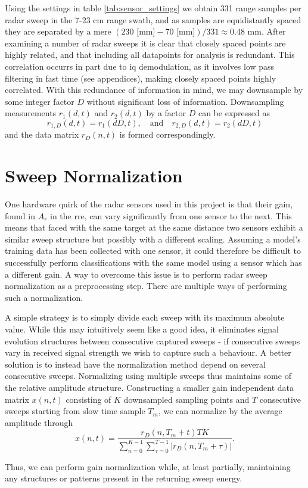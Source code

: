 Using the settings in table \ref{tab:sensor_settings} we obtain 331 range samples per radar sweep in the 7-23 cm range swath, and as samples are equidistantly spaced they are separated by a mere $(230 \text{ [mm]}-70\text{ [mm]})/331\approx0.48$ mm. After examining a number of radar sweeps it is clear that closely spaced points are highly related, and that including all datapoints for analysis is redundant. This correlation occurrs in part due to \gls{iq} demodulation, as it involves low pass filtering in fast time (see appendices), making closely spaced points highly correlated. With this redundance of information in mind, we may downsample by some integer factor $D$ without significant loss of information. Downsampling measurements $r_1(d,t)$ and $r_2(d,t)$ by a factor $D$ can be expressed as
\begin{equation}
\label{eq:downsamp}
	r_{1,D}(d, t) = r_{1}(dD,t),
	\quad \text{and} \quad r_{2,D}(d,t) = r_{2}(dD,t)
\end{equation}
and the data matrix $r_D(n,t)$ is formed correspondingly.

\section{Sweep Normalization}\label{sec:norm}

One hardware quirk of the radar sensors used in this project is that their gain, found in $A_r$ in the \gls{rre}, can vary significantly from one sensor to the next. This means that faced with the same target at the same distance two sensors exhibit a similar sweep structure but possibly with a different scaling. Assuming a model's training data has been collected with one sensor, it could therefore be difficult to successfully perform classifications with the same model using a sensor which has a different gain. A way to overcome this issue is to perform radar sweep normalization as a preprocessing step. There are multiple ways of performing such a normalization. %

A simple strategy is to simply divide each sweep with its maximum absolute value. While this may intuitively seem like a good idea, it eliminates signal evolution structures between consecutive captured sweeps - if consecutive sweeps vary in received signal strength we wish to capture such a behaviour. A better solution is to instead have the normalization method depend on several consecutive sweeps. Normalizing using multiple sweeps thus maintains some of the relative amplitude structure. Constructing a smaller gain independent data matrix $x(n,t)$ consisting of $K$ downsampled sampling points and $T$ consecutive sweeps starting from slow time sample $T_m$, we can normalize by the average amplitude through
\begin{equation}
	x(n,t) = 
	\frac{r_D(n, T_m + t)TK}{\sum_{n=0}^{K-1}\sum_{\tau=0}^{T-1}|r_D(n, T_m+\tau)|}.
\end{equation}

Thus, we can perform gain normalization while, at least partially, maintaining any structures or patterns present in the returning sweep energy. 

